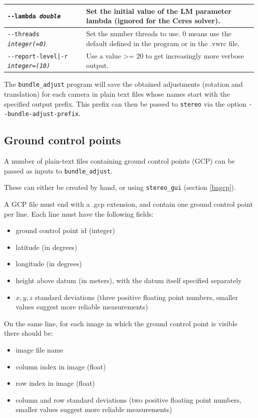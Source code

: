 \begin{longtable}{|l|p{7.5cm}|}
\texttt{-\/-lambda \textit{double}} & Set the initial value of the LM parameter
lambda (ignored for the Ceres solver).\\ \hline

\texttt{-\/-threads \textit{integer(=0)}} & Set the number threads to use. 0 means use the default defined in the program or in the .vwrc file.\\ \hline

\texttt{-\/-report-level|-r \textit{integer=(10)}} & Use a value >= 20 to
get increasingly more verbose output. \\ \hline
\end{longtable}

The \texttt{bundle\_adjust} program will save the obtained adjustments
(rotation and translation) for each camera in plain text files whose
names start with the specified output prefix. This prefix can then be
passed to \texttt{stereo} via the option
\texttt{-\/-bundle-adjust-prefix}.

\subsection{Ground control points}

A number of plain-text files containing ground control points (GCP) can be
passed as inputs to \texttt{bundle\_adjust}.

These can either be created by hand, or using \texttt{stereo\_gui}
(section \ref{bagcp}).

A GCP file must end with a .gcp extension, and contain one ground
control point per line. Each line must have the following fields:
\begin{itemize}
\item ground control point id (integer)
\item latitude (in degrees)
\item longitude (in degrees)
\item height above datum (in meters), with the datum itself specified separately
\item $x, y, z$ standard deviations (three positive floating point
  numbers, smaller values suggest more reliable measurements)
\end{itemize}

On the same line, for each image in which the ground control point is
visible there should be:

\begin{itemize}
\item image file name
\item column index in image (float)
\item row index in image (float)
\item column and row standard deviations (two positive floating point
  numbers, smaller values suggest more reliable measurements)
\end{itemize}

